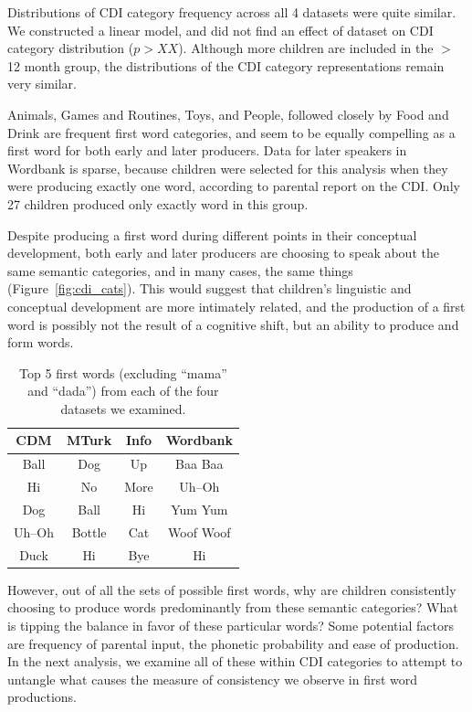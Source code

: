 \documentclass[10pt,letterpaper]{article}
\begin{document}
Distributions of CDI category frequency across all 4 datasets were quite similar. We constructed a linear model, and did not find an effect of dataset on CDI category distribution ($p > XX$). Although more children are included in the $>$ 12 month group, the distributions of the CDI category representations remain very similar.

Animals, Games and Routines, Toys, and People, followed closely by Food and Drink are frequent first word categories, and seem to be equally compelling as a first word for both early and later producers. Data for later speakers in Wordbank is sparse, because children were selected for this analysis when they were producing exactly one word, according to parental report on the CDI. Only 27 children produced only exactly word in this group.

Despite producing a first word during different points in their conceptual development, both early and later producers are choosing to speak about the same semantic categories, and in many cases, the same things (Figure~\ref{fig:cdi_cats}). This would suggest that children's linguistic and conceptual development are more intimately related, and the production of a first word is possibly not the result of a cognitive shift, but an ability to produce and form words.

\begin{table}[tb]
\centering
\begin{tabular}{cccc}
\hline
{\bf CDM} & {\bf MTurk} & {\bf Info} & {\bf Wordbank} \\ 
\hline
Ball & Dog & Up & Baa Baa \\ 
Hi & No & More & Uh--Oh \\
Dog & Ball & Hi & Yum Yum \\ 
Uh--Oh & Bottle & Cat & Woof Woof \\ 
Duck & Hi & Bye & Hi \\ 
\hline 
\end{tabular}
\caption{\label{tab:top5} Top 5 first words (excluding ``mama'' and ``dada'') from each of the four datasets we examined.}
\end{table}

However, out of all the sets of possible first words, why are children consistently choosing to produce words predominantly from these semantic categories? What is tipping the balance in favor of these particular words? Some potential factors are frequency of parental input, the phonetic probability and ease of production. In the next analysis, we examine all of these within CDI categories to attempt to untangle what causes the measure of consistency we observe in first word productions.
\end{document}
